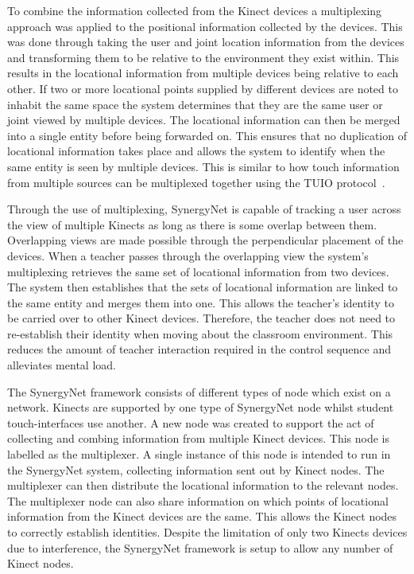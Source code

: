 \documentclass[link]{IWCOMP}
\begin{document}
To combine the information collected from the Kinect devices a multiplexing approach was applied to the positional information collected by the devices.
This was done through taking the user and joint location information from the devices and transforming them to be relative to the environment they exist within.
This results in the locational information from multiple devices being relative to each other.
If two or more locational points supplied by different devices are noted to inhabit the same space the system determines that they are the same user or joint viewed by multiple devices.
The locational information can then be merged into a single entity before being forwarded on.
This ensures that no duplication of locational information takes place and allows the system to identify when the same entity is seen by multiple devices.
This is similar to how touch information from multiple sources can be multiplexed together using the TUIO protocol~\cite{Kaltenbrunner2009}.

Through the use of multiplexing, SynergyNet is capable of tracking a user across the view of multiple Kinects as long as there is some overlap between them.
Overlapping views are made possible through the perpendicular placement of the devices. 
When a teacher passes through the overlapping view the system's multiplexing retrieves the same set of locational information from two devices.
The system then establishes that the sets of locational information are linked to the same entity and merges them into one.
This allows the teacher's identity to be carried over to other Kinect devices.
Therefore, the teacher does not need to re-establish their identity when moving about the classroom environment.
This reduces the amount of teacher interaction required in the control sequence and alleviates mental load. 

The SynergyNet framework consists of different types of node which exist on a network.
Kinects are supported by one type of SynergyNet node whilst student touch-interfaces use another.
A new node was created to support the act of collecting and combing information from multiple Kinect devices.
This node is labelled as the multiplexer.
A single instance of this node is intended to run in the SynergyNet system, collecting information sent out by Kinect nodes.
The multiplexer can then distribute the locational information to the relevant nodes.
The multiplexer node can also share information on which points of locational information from the Kinect devices are the same.
This allows the Kinect nodes to correctly establish identities.
Despite the limitation of only two Kinects devices due to interference, the SynergyNet framework is setup to allow any number of Kinect nodes.
\end{document}
